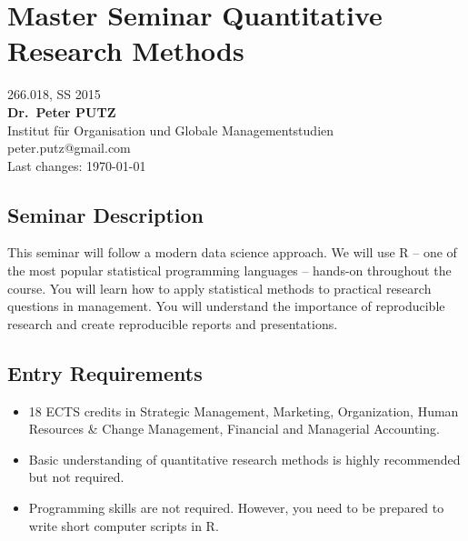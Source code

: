 \documentclass[]{article}
\author{}
\date{}
\begin{document}

\centering

\section{Master Seminar Quantitative Research
Methods}\label{master-seminar-quantitative-research-methods}

266.018, SS 2015\\\textbf{Dr.~Peter PUTZ}\\Institut für Organisation und
Globale Managementstudien\\peter.putz@gmail.com\\Last changes: \today

\raggedright

\subsection{Seminar Description}\label{seminar-description}

This seminar will follow a modern data science approach. We will use R
-- one of the most popular statistical programming languages -- hands-on
throughout the course. You will learn how to apply statistical methods
to practical research questions in management. You will understand the
importance of reproducible research and create reproducible reports and
presentations.

\subsection{Entry Requirements}\label{entry-requirements}

\begin{itemize}
\itemsep1pt\parskip0pt
\item
  18 ECTS credits in Strategic Management, Marketing, Organization,
  Human Resources \& Change Management, Financial and Managerial
  Accounting.
\item
  Basic understanding of quantitative research methods is highly
  recommended but not required.
\item
  Programming skills are not required. However, you need to be prepared
  to write short computer scripts in R.
\end{itemize}
\end{document}
